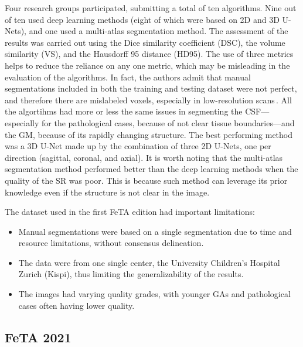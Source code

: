 Four research groups participated, submitting a total of ten algorithms. Nine out of ten used deep learning methods (eight of which were based on 2D and 3D U-Nets), and one used a multi-atlas segmentation method. The assessment of the results was carried out using the Dice similarity coefficient (DSC), the volume similarity (VS), and the Hausdorff 95 distance (HD95). The use of three metrics helps to reduce the reliance on any one metric, which may be misleading in the evaluation of the algorithms. In fact, the authors admit that manual segmentations included in both the training and testing dataset were not perfect, and therefore there are mislabeled voxels, especially in low-resolution scans\,\cite{FeTA2021_review}. All the algortihms had more or less the same issues in segmenting the CSF---especially for the pathological cases, because of not clear tissue boundaries---and the GM, because of its rapidly changing structure. The best performing method was a 3D U-Net made up by the combination of three 2D U-Nets, one per direction (sagittal, coronal, and axial). It is worth noting that the multi-atlas segmentation method performed better than the deep learning methods when the quality of the SR was poor. This is because such method can leverage its prior knowledge even if the structure is not clear in the image.

The dataset used in the first FeTA edition had important limitations:
\begin{itemize}
    \item Manual segmentations were based on a single segmentation due to time and resource limitations, without consensus delineation.
    \item The data were from one single center, the University Children's Hospital Zurich (Kispi), thus limiting the generalizability of the results.
    \item The images had varying quality grades, with younger GAs and pathological cases often having lower quality.
\end{itemize}

\subsection{FeTA 2021}

